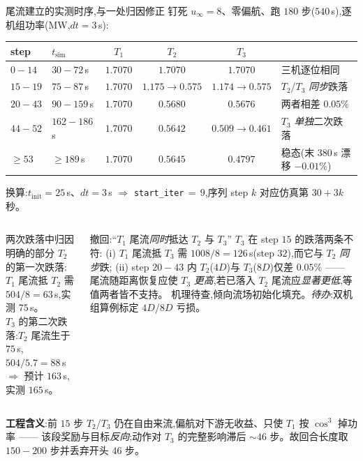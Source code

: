 \documentclass[aspectratio=169,11pt,UTF8]{ctexbeamer}
\newcommand{\wind}{u_{\infty}}
\begin{document}
\begin{frame}{尾流建立的实测时序,与一处归因修正}
\footnotesize
钉死 $\wind\!=\!8$、零偏航、跑 $180$ 步($540$\,s),逐机组功率(MW,$dt\!=\!3$\,s):
\begin{center}\renewcommand{\arraystretch}{1.12}\scriptsize
\begin{tabular}{@{}llcccl@{}}
\toprule
step & $t_{\mathrm{sim}}$ & $T_1$ & $T_2$ & $T_3$ & \\
\midrule
$0\!-\!14$   & $30\!-\!72$\,s   & $1.7070$ & $1.7070$            & $1.7070$            & 三机逐位相同 \\
$15\!-\!19$  & $75\!-\!87$\,s   & $1.7070$ & $1.175\!\to\!0.575$ & $1.174\!\to\!0.575$ & $T_2$/$T_3$ \emph{同步}跌落 \\
$20\!-\!43$  & $90\!-\!159$\,s  & $1.7070$ & $0.5680$            & $0.5676$            & 两者相差 $0.05\%$ \\
$44\!-\!52$  & $162\!-\!186$\,s & $1.7070$ & $0.5642$            & $0.509\!\to\!0.461$ & $T_3$ \emph{单独}二次跌落 \\
$\ge 53$     & $\ge 189$\,s     & $1.7070$ & $0.5645$            & $0.4797$            & 稳态(末 $380$\,s 漂移 $-0.01\%$) \\
\bottomrule
\end{tabular}
\end{center}
\vspace{-1mm}
{\scriptsize\color{mygray}换算:$t_{\mathrm{init}}\!=\!25$\,s、$dt\!=\!3$\,s $\Rightarrow$ \texttt{start\_iter}$\,=\,9$,序列 step $k$ 对应仿真第 $30\!+\!3k$ 秒。}
\vspace{0.6mm}
\begin{columns}[T]
\begin{block}{两次跌落中归因明确的部分}
\scriptsize
$T_2$ 的第一次跌落:$T_1$ 尾流抵 $T_2$ 需 $504/8\!=\!63$\,s,实测 $75$\,s。\\[0.4mm]
$T_3$ 的第二次跌落:$T_2$ 尾流生于 $75$\,s,$504/5.7\!=\!88$\,s $\Rightarrow$ 预计 $163$\,s,实测 $165$\,s。
\end{block}
\begin{alertblock}{撤回:“$T_1$ 尾流\emph{同时}抵达 $T_2$ 与 $T_3$”}
\scriptsize
$T_3$ 在 step $15$ 的跌落两条不符:
(i) $T_1$ 尾流抵 $T_3$ 需 $1008/8\!=\!126$\,s(step $32$),而它与 $T_2$ \emph{同步}跌;
(ii) step $20\!-\!43$ 内 $T_2$($4D$)与 $T_3$($8D$)仅差 $0.05\%$ —— 尾流随距离恢复应使 $T_3$ \emph{更高},若已落入 $T_2$ 尾流应\emph{显著更低},等值两者皆不支持。
机理待查,倾向流场初始化填充。\emph{待办}:双机组算例标定 $4D$/$8D$ 亏损。
\end{alertblock}
\end{columns}
\vspace{-1mm}
{\scriptsize\color{mygray}\textbf{工程含义}:前 $15$ 步 $T_2$/$T_3$ 仍在自由来流,偏航对下游无收益、只使 $T_1$ 按 $\cos^3$ 掉功率 —— 该段奖励与目标\emph{反向};动作对 $T_3$ 的完整影响滞后 $\sim\!46$ 步。故回合长度取 $150\!-\!200$ 步并丢弃开头 $46$ 步。}
\end{frame}
\end{document}
